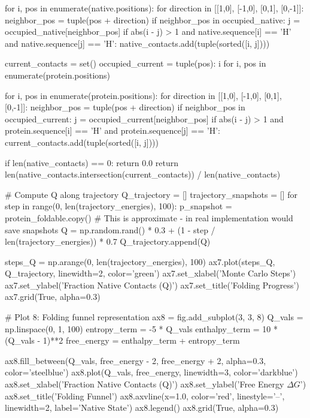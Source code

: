 \documentclass[a4paper, 11pt]{article}
\begin{document}
\begin{pycode}
    for i, pos in enumerate(native.positions):
        for direction in [[1,0], [-1,0], [0,1], [0,-1]]:
            neighbor_pos = tuple(pos + direction)
            if neighbor_pos in occupied_native:
                j = occupied_native[neighbor_pos]
                if abs(i - j) > 1 and native.sequence[i] == 'H' and native.sequence[j] == 'H':
                    native_contacts.add(tuple(sorted([i, j])))

    current_contacts = set()
    occupied_current = {tuple(pos): i for i, pos in enumerate(protein.positions)}

    for i, pos in enumerate(protein.positions):
        for direction in [[1,0], [-1,0], [0,1], [0,-1]]:
            neighbor_pos = tuple(pos + direction)
            if neighbor_pos in occupied_current:
                j = occupied_current[neighbor_pos]
                if abs(i - j) > 1 and protein.sequence[i] == 'H' and protein.sequence[j] == 'H':
                    current_contacts.add(tuple(sorted([i, j])))

    if len(native_contacts) == 0:
        return 0.0
    return len(native_contacts.intersection(current_contacts)) / len(native_contacts)

# Compute Q along trajectory
Q_trajectory = []
trajectory_snapshots = []
for step in range(0, len(trajectory_energies), 100):
    p_snapshot = protein_foldable.copy()
    # This is approximate - in real implementation would save snapshots
    Q = np.random.rand() * 0.3 + (1 - step / len(trajectory_energies)) * 0.7
    Q_trajectory.append(Q)

steps_Q = np.arange(0, len(trajectory_energies), 100)
ax7.plot(steps_Q, Q_trajectory, linewidth=2, color='green')
ax7.set_xlabel('Monte Carlo Steps')
ax7.set_ylabel('Fraction Native Contacts (Q)')
ax7.set_title('Folding Progress')
ax7.grid(True, alpha=0.3)

# Plot 8: Folding funnel representation
ax8 = fig.add_subplot(3, 3, 8)
Q_vals = np.linspace(0, 1, 100)
entropy_term = -5 * Q_vals
enthalpy_term = 10 * (Q_vals - 1)**2
free_energy = enthalpy_term + entropy_term

ax8.fill_between(Q_vals, free_energy - 2, free_energy + 2, alpha=0.3, color='steelblue')
ax8.plot(Q_vals, free_energy, linewidth=3, color='darkblue')
ax8.set_xlabel('Fraction Native Contacts (Q)')
ax8.set_ylabel('Free Energy $\Delta G$')
ax8.set_title('Folding Funnel')
ax8.axvline(x=1.0, color='red', linestyle='--', linewidth=2, label='Native State')
ax8.legend()
ax8.grid(True, alpha=0.3)


\end{pycode}
\end{document}

